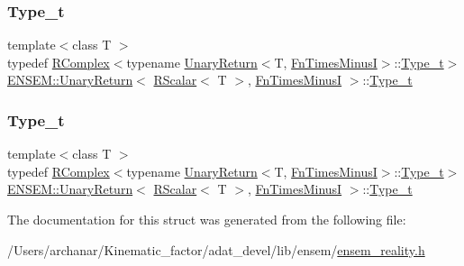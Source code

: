 \subsubsection{\texorpdfstring{Type\_t}{Type\_t}\hspace{0.1cm}{\footnotesize\ttfamily [1/2]}}
{\footnotesize\ttfamily template$<$class T $>$ \\
typedef \mbox{\hyperlink{classENSEM_1_1RComplex}{R\+Complex}}$<$typename \mbox{\hyperlink{structENSEM_1_1UnaryReturn}{Unary\+Return}}$<$T, \mbox{\hyperlink{structENSEM_1_1FnTimesMinusI}{Fn\+Times\+MinusI}}$>$\+::\mbox{\hyperlink{structENSEM_1_1UnaryReturn_3_01RScalar_3_01T_01_4_00_01FnTimesMinusI_01_4_a89dcc5ccc293077b2cb0c8328b6c883a}{Type\+\_\+t}}$>$ \mbox{\hyperlink{structENSEM_1_1UnaryReturn}{E\+N\+S\+E\+M\+::\+Unary\+Return}}$<$ \mbox{\hyperlink{classENSEM_1_1RScalar}{R\+Scalar}}$<$ T $>$, \mbox{\hyperlink{structENSEM_1_1FnTimesMinusI}{Fn\+Times\+MinusI}} $>$\+::\mbox{\hyperlink{structENSEM_1_1UnaryReturn_3_01RScalar_3_01T_01_4_00_01FnTimesMinusI_01_4_a89dcc5ccc293077b2cb0c8328b6c883a}{Type\+\_\+t}}}

\mbox{\label{structENSEM_1_1UnaryReturn_3_01RScalar_3_01T_01_4_00_01FnTimesMinusI_01_4_a89dcc5ccc293077b2cb0c8328b6c883a}} 
\subsubsection{\texorpdfstring{Type\_t}{Type\_t}\hspace{0.1cm}{\footnotesize\ttfamily [2/2]}}
{\footnotesize\ttfamily template$<$class T $>$ \\
typedef \mbox{\hyperlink{classENSEM_1_1RComplex}{R\+Complex}}$<$typename \mbox{\hyperlink{structENSEM_1_1UnaryReturn}{Unary\+Return}}$<$T, \mbox{\hyperlink{structENSEM_1_1FnTimesMinusI}{Fn\+Times\+MinusI}}$>$\+::\mbox{\hyperlink{structENSEM_1_1UnaryReturn_3_01RScalar_3_01T_01_4_00_01FnTimesMinusI_01_4_a89dcc5ccc293077b2cb0c8328b6c883a}{Type\+\_\+t}}$>$ \mbox{\hyperlink{structENSEM_1_1UnaryReturn}{E\+N\+S\+E\+M\+::\+Unary\+Return}}$<$ \mbox{\hyperlink{classENSEM_1_1RScalar}{R\+Scalar}}$<$ T $>$, \mbox{\hyperlink{structENSEM_1_1FnTimesMinusI}{Fn\+Times\+MinusI}} $>$\+::\mbox{\hyperlink{structENSEM_1_1UnaryReturn_3_01RScalar_3_01T_01_4_00_01FnTimesMinusI_01_4_a89dcc5ccc293077b2cb0c8328b6c883a}{Type\+\_\+t}}}



The documentation for this struct was generated from the following file\+:\begin{DoxyCompactItemize}
\item 
/\+Users/archanar/\+Kinematic\+\_\+factor/adat\+\_\+devel/lib/ensem/\mbox{\hyperlink{lib_2ensem_2ensem__reality_8h}{ensem\+\_\+reality.\+h}}\end{DoxyCompactItemize}
